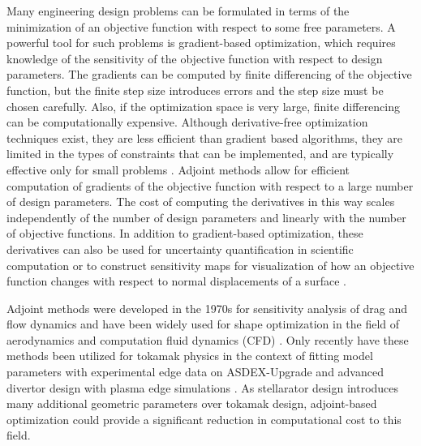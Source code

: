 \documentclass[aps,unsortedaddress]{revtex4-1}
\begin{document}
Many engineering design problems can be formulated in terms of the minimization of an objective function with respect to some free parameters. A powerful tool for such problems is gradient-based optimization, which requires knowledge of the sensitivity of the objective function with respect to design parameters. The gradients can be computed by finite differencing of the objective function, but the finite step size introduces errors and the step size must be chosen carefully. Also, if the optimization space is very large, finite differencing 
can be computationally expensive. Although derivative-free optimization techniques exist, they are less efficient than gradient based algorithms, they are limited in the types of constraints that can be implemented, and are typically effective only for small problems \cite{Nocedal2006}. Adjoint methods allow for efficient computation of gradients of the objective function with respect to a large number of design parameters. The cost of computing the derivatives in this way scales independently of the number of design parameters and linearly with the number of objective functions. In addition to gradient-based optimization, these derivatives can also be used for uncertainty quantification in scientific computation \cite{Roy2011} or to construct sensitivity maps for visualization of how an objective function changes with respect to normal displacements of a surface \cite{Othmer2008,Othmer2014}. 

Adjoint methods were developed in the 1970s for sensitivity analysis of drag and flow dynamics \cite{Pironneau1974} and have been widely used for shape optimization in the field of aerodynamics and computation fluid dynamics (CFD) \cite{Kuruvila1995,Jameson1998,Anderson1999,Othmer2008,Othmer2014}. Only recently have these methods been utilized for tokamak physics in the context of fitting model parameters with experimental edge data on ASDEX-Upgrade \cite{Kim2001} and advanced divertor design with plasma edge simulations \cite{Baelmans2017}. As stellarator design introduces many additional geometric parameters over tokamak design, adjoint-based optimization could provide a significant reduction in computational cost to this field. 

\end{document}
